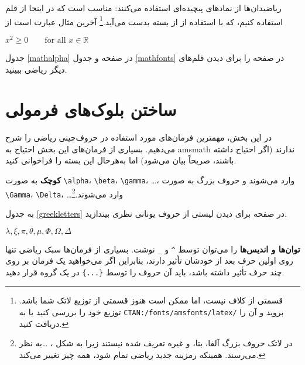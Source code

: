 ریاضیدان‌ها از نمادهای پیچیده‌ای استفاده می‌کنند: مناسب است که در اینجا از قلم  استفاده کنیم، 
 که با استفاده از  از بسته   بدست می‌آید.\footnote{ قسمتی از کلاف \lr{} نیست، اما ممکن است هنوز قسمتی از توزیع لاتک شما باشد. توزیع خود را بررسی کنید یا به  \texttt{CTAN:/fonts/amsfonts/latex/} بروید و آن را دریافت کنید.}
\ifx\mathbb\undefined\else
آخرین مثال عبارت است از

\begin{example}
$x^{2} \geq 0\qquad
 \text{for all } x 
 \in \mathbb{R}$
\end{example}
\fi

جدول 
\ref{mathalpha}
 در صفحه 
\pageref{mathalpha}
و جدول  
\ref{mathfonts}
در صفحه
\pageref{mathfonts}
را برای دیدن قلم‌های دیگر ریاضی ببینید.

\section{ساختن بلوک‌های فرمولی}

در این بخش، مهمترین فرمان‌های مورد استفاده در حروف‌چینی ریاضی را شرح می‌دهیم. بسیاری از فرمان‌های این بخش احتیاج به 
\textsf{amsmath} ندارند 
(اگر احتیاج داشته باشند، صریحاً بیان می‌شود)
اما به‌هر‌حال این بسته را فراخوانی کنید.


\textbf{کوچک} 
به‌ صورت \verb|\alpha|،  \verb|\beta|، \verb|\gamma|، \ldots، وارد می‌شوند و حروف بزرگ به صورت  \verb|\Gamma|، \verb|\Delta|، \ldots وارد می‌شوند.\footnote{در لاتک حروف بزرگ آلفا، بتا، و غیره تعریف شده نیستند زیرا به شکل ، \ldots به نظر می‌رسند. همینکه رمزینه جدید ریاضی تمام شود، همه چیز تغییر می‌کند.}

به جدول  
\ref{greekletters}
در صفحه 
\pageref{greekletters} برای دیدن لیستی از حروف یونانی نظری بیندازید.
\begin{example}
$\lambda,\xi,\pi,\theta,
 \mu,\Phi,\Omega,\Delta$
\end{example}


\textbf{توان‌ها و اندیس‌ها}
را می‌توان توسط 
\verb|^|
 و 
\verb|_|%
 نوشت.
بسیاری از فرمان‌ها سبک ریاضی تنها روی اولین حرف بعد از خودشان تأثیر دارند، بنابراین اگر می‌خواهید یک فرمان بر روی چند حرف تأثیر داشته باشد، باید آن حروف را توسط  \verb|{...}| در یک گروه قرار دهید.

